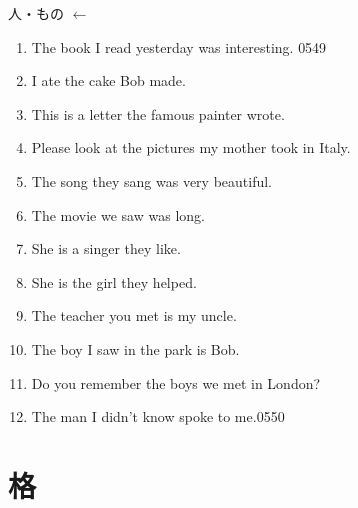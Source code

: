 \documentclass[aspectratio=169,xcolor={dvipsnames,table}]{beamer}
\begin{document}
\begin{frame}[plain,label=ichiran]{人・もの $\leftarrow$ }
 \begin{enumerate}
  \item The book  I read yesterday was interesting.%
\hfill{\tiny 0549}\,{\scriptsize {}}
  \item I ate the cake  Bob made.
  \item This is a letter  the famous painter wrote.
  \item Please look at the pictures  my mother took in Italy.
  \item The song  they sang was very beautiful.
  \item The movie  we saw was long.
  \item She is a singer  they like.
  \item She is the girl  they helped.
  \item The teacher  you met is my uncle.
  \item The boy  I saw in the park is Bob.
  \item Do you remember the boys  we met in London?
  \item The man  I didn't know spoke to me.\hfill{\tiny 0550}\,{\scriptsize {}}

 \end{enumerate}
\end{frame}
\section{格}
\end{document}
